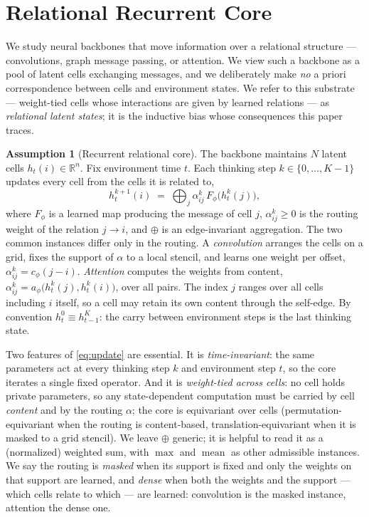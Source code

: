 \documentclass{article} %
\theoremstyle{plain}
\theoremstyle{definition}
\newtheorem{assumption}{Assumption}[section]
\begin{document}
\section{Relational Recurrent Core}
\label{sec:core}

We study neural backbones that move information over a relational structure ---
convolutions, graph message passing, or attention. We view such a backbone as a
pool of latent cells exchanging messages, and we deliberately make \emph{no} a
priori correspondence between cells and environment states. We refer to this
substrate --- weight-tied cells whose interactions are given by learned
relations --- as \emph{relational latent states}; it is the inductive bias
whose consequences this paper traces.

\begin{assumption}[Recurrent relational core]
\label{ass:core}
The backbone maintains $N$ latent cells $h_t(i)\in\mathbb R^{n}$. Fix
environment time $t$. Each thinking step $k\in\{0,\dots,K-1\}$ updates every
cell from the cells it is related to,
\begin{equation}
  h_t^{k+1}(i)
  \;=\;
  \bigoplus_{j}
  \alpha^{k}_{ij}\,
  F_{\phi}\bigl(h_t^{k}(j)\bigr),
  \label{eq:update}
\end{equation}
where $F_\phi$ is a learned map producing the message of cell $j$,
$\alpha^{k}_{ij}\geq 0$ is the routing weight of the relation $j\to i$, and
$\oplus$ is an edge-invariant aggregation. The two common instances differ
only in the routing. A \emph{convolution} arranges the cells on a grid, fixes
the support of $\alpha$ to a local stencil, and learns one weight per offset,
$\alpha^{k}_{ij}=c_\phi(j-i)$. \emph{Attention} computes the weights from
content, $\alpha^{k}_{ij}=a_\phi\bigl(h_t^{k}(j),h_t^{k}(i)\bigr)$, over all
pairs. The index $j$ ranges over all cells including $i$ itself, so a cell may
retain its own content through the self-edge. By convention
$h_t^{0}\equiv h_{t-1}^{K}$: the carry between environment steps is the last
thinking state.
\end{assumption}

Two features of \eqref{eq:update} are essential. It is \emph{time-invariant}:
the same parameters act at every thinking step $k$ and environment step $t$,
so the core iterates a single fixed operator. And it is \emph{weight-tied
across cells}: no cell holds private parameters, so any state-dependent
computation must be carried by cell \emph{content} and by the routing
$\alpha$; the core is equivariant over cells (permutation-equivariant when
the routing is content-based, translation-equivariant when it is masked to a
grid stencil). We leave $\oplus$ generic; it is helpful to read it as a
(normalized) weighted sum, with $\max$ and $\operatorname{mean}$ as other
admissible instances. We say the routing is \emph{masked} when its support is
fixed and only the weights on that support are learned, and \emph{dense} when
both the weights and the support --- which cells relate to which --- are
learned: convolution is the masked instance, attention the dense one.
\end{document}
